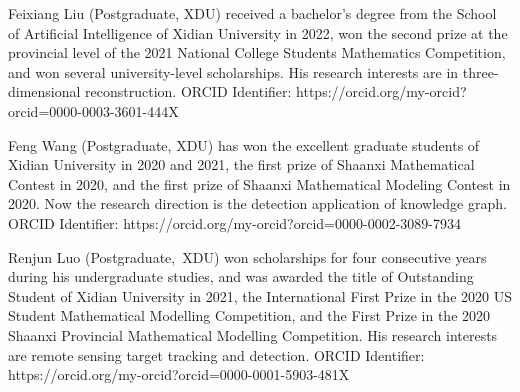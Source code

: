 \documentclass[journal]{IEEEtran}
\begin{document}
 \begin{IEEEbiography}{Feixiang Liu}
(Postgraduate, XDU) received a bachelor's degree from the School of Artificial Intelligence of Xidian University in 2022, won the second prize at the provincial level of the 2021 National College Students Mathematics Competition, and won several university-level scholarships. His research interests are in three-dimensional reconstruction. ORCID Identifier: https://orcid.org/my-orcid?orcid=0000-0003-3601-444X
\end{IEEEbiography}

  \begin{IEEEbiography}{Feng Wang}
(Postgraduate, XDU) has won the excellent graduate students of Xidian University in 2020 and 2021, the first prize of Shaanxi Mathematical Contest in 2020, and the first prize of Shaanxi Mathematical Modeling Contest in 2020. Now the research direction is the detection application of knowledge graph. ORCID Identifier: https://orcid.org/my-orcid?orcid=0000-0002-3089-7934
 \end{IEEEbiography}

 \begin{IEEEbiography}{Renjun Luo}
(Postgraduate,~XDU) won scholarships for four consecutive years during his undergraduate studies, and was awarded the title of Outstanding Student of Xidian University in 2021, the International First Prize in the 2020 US Student Mathematical Modelling Competition, and the First Prize in the 2020 Shaanxi Provincial Mathematical Modelling Competition. His research interests are remote sensing target tracking and detection. ORCID Identifier: https://orcid.org/my-orcid?orcid=0000-0001-5903-481X
\end{IEEEbiography}
\end{document}
